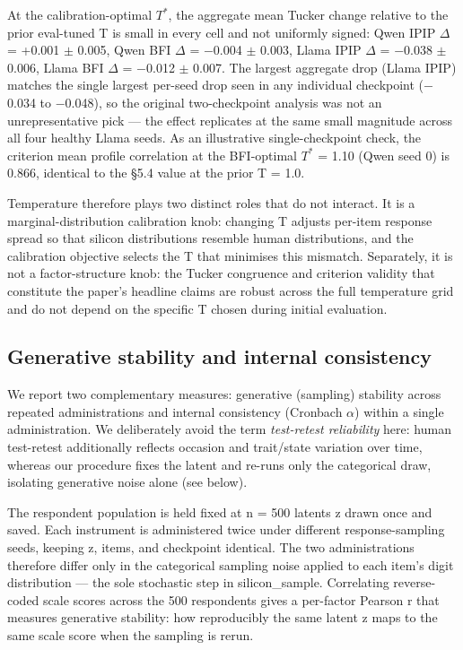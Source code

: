 \documentclass[11pt]{article}
\begin{document}
At the calibration-optimal $T^*$, the aggregate mean Tucker change relative to the prior eval-tuned T is small in every cell and not uniformly signed: Qwen IPIP $\Delta$ = +0.001 $\pm$ 0.005, Qwen BFI $\Delta$ = $-$0.004 $\pm$ 0.003, Llama IPIP $\Delta$ = $-$0.038 $\pm$ 0.006, Llama BFI $\Delta$ = $-$0.012 $\pm$ 0.007. The largest aggregate drop (Llama IPIP) matches the single largest per-seed drop seen in any individual checkpoint ($-$0.034 to $-$0.048), so the original two-checkpoint analysis was not an unrepresentative pick — the effect replicates at the same small magnitude across all four healthy Llama seeds. As an illustrative single-checkpoint check, the criterion mean profile correlation at the BFI-optimal $T^*$ = 1.10 (Qwen seed 0) is 0.866, identical to the \S{}5.4 value at the prior T = 1.0.

Temperature therefore plays two distinct roles that do not interact. It is a marginal-distribution calibration knob: changing T adjusts per-item response spread so that silicon distributions resemble human distributions, and the calibration objective selects the T that minimises this mismatch. Separately, it is not a factor-structure knob: the Tucker congruence and criterion validity that constitute the paper's headline claims are robust across the full temperature grid and do not depend on the specific T chosen during initial evaluation.

\subsection{Generative stability and internal consistency}

We report two complementary measures: generative (sampling) stability across repeated administrations and internal consistency (Cronbach $\alpha$) within a single administration. We deliberately avoid the term \emph{test-retest reliability} here: human test-retest additionally reflects occasion and trait/state variation over time, whereas our procedure fixes the latent and re-runs only the categorical draw, isolating generative noise alone (see below).

The respondent population is held fixed at n = 500 latents z drawn once and saved. Each instrument is administered twice under different response-sampling seeds, keeping z, items, and checkpoint identical. The two administrations therefore differ only in the categorical sampling noise applied to each item's digit distribution — the sole stochastic step in silicon\_sample. Correlating reverse-coded scale scores across the 500 respondents gives a per-factor Pearson r that measures generative stability: how reproducibly the same latent z maps to the same scale score when the sampling is rerun.
\end{document}
